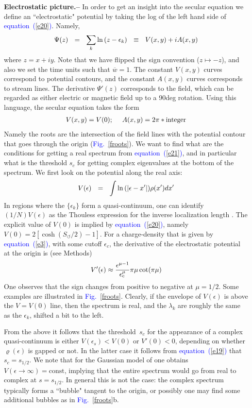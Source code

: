 \documentclass[aps,pre,floats,floatfix,twocolumn]{revtex4}
\newcommand{\be}[1]{\begin{eqnarray}\ifthenelse{#1=-1}{\nonumber}{\ifthenelse{#1=0}{}{\label{e#1}}}}
\newcommand{\eeq}{\end{eqnarray}}
\newcommand{\Eq}[1]{\textcolor{blue}{{equation}\!~(\ref{#1})}}
\newcommand{\Fig}[1]{\textcolor{blue}{Fig.}\!\!~\ref{#1}}
\newcommand{\sect}[1]{{\bf #1.-- }}
\newcommand{\rmrk}[1]{{\color[rgb]{0.6,0,0.1} #1}}
\begin{document}
\sect{Electrostatic picture}
%
In order to get an insight into the secular equation we 
define an ``electrostatic" potential by taking the log 
of the left hand side of \Eq{e20}. Namely, 
%
\be{22}
\Psi(z) \ \ = \ \ \sum_k \ln\left(z-\epsilon_k\right) \ \ \equiv \ \ V(x,y)+iA(x,y)
\eeq
%
where ${z=x+iy}$. Note that we have flipped the sign convention (${z\mapsto -z}$), 
and also we set the time units such that $\overline{w}=1$.
% 
The constant ${V(x,y)}$ curves correspond to potential contours,
and the constant ${A(x,y)}$ curves corresponds 
to stream lines. The derivative $\Psi'(z)$ corresponds to the field, 
which can be regarded as either electric or magnetic field up to a 90deg rotation.       
Using this language, the secular equation takes the form
%
\be{21}
V(x,y)=V(0); \ \ \ \ A(x,y)=2\pi*\text{integer} 
\eeq
%
Namely the roots are the intersection of the field lines with the 
potential contour that goes through the origin (\Fig{froots}). 
%
%
We want to find what are the conditions for getting 
a real spectrum from \Eq{e21}, and in particular what 
is the threshold $s_c$ for getting complex eigenvalues 
at the bottom of the spectrum. 
We first look on the potential along the real axis:
%
\be{23}
V(\epsilon) \ \ = \ \  \int \ln \left(|\epsilon-x' \right|) \rho(x')dx' 
\eeq
%
In regions where the $\{\epsilon_k\}$ form a quasi-continuum,  
one can identify $(1/N)V(\epsilon)$ as the Thouless expression  
for the inverse localization length \cite{Shnerb1}.
The explicit value of $V(0)$ is implied by \Eq{e20}, \rmrk{namely ${V(0)=2[\cosh(S_{\circlearrowleft}/2)-1]}$}.   
For a charge-density that is given by \Eq{e3}, with some cutoff $\epsilon_c$,
the derivative of the electrostatic potential at the origin is (see Methods)
%
\be{19}
V'(\epsilon) \approx  \frac{ \epsilon^{\mu-1}}{\epsilon_c^{\mu}} \pi \mu \cot(\pi \mu)
\eeq
%
One observes that the sign changes from positive to negative at $\mu=1/2$.
Some examples are illustrated in \Fig{froots}.
Clearly, if the envelope of $V(\epsilon)$ is above 
the $V=V(0)$ line, then the spectrum is real, and the $\lambda_k$ are roughly 
the same as the $\epsilon_k$, shifted a bit to the left. 


From the above it follows that the threshold~$s_c$ 
for the appearance of a complex quasi-continuum 
is either  ${V(\epsilon_s)<V(0)}$  or  ${V'(0)<0}$, 
depending on whether $\varrho(\epsilon)$ is gapped or not. 
In the latter case it follows from \Eq{e19} that ${s_c=s_{1/2}}$.
%
We note that for the Gaussian model of \cite{odh3}
one obtains ${V(\epsilon \rightarrow \infty) = \text{const}}$,  
implying that the entire spectrum would go from real to complex at $s=s_{1/2}$. 
In general this is not the case: the complex spectrum typically 
forms a ``bubble" tangent to the origin, or possibly 
one may find some additional bubbles as in \Fig{froots}b.   
\end{document}
